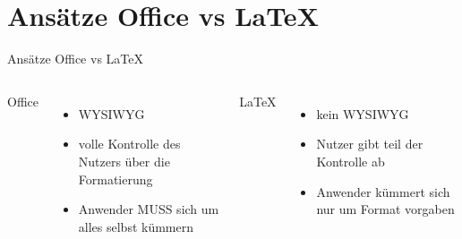 \section{Ansätze Office  vs  \LaTeX}

\begin{frame}{Ansätze Office  vs  \LaTeX}
	\begin{columns}
	
		Office
		\begin{itemize}
			\item WYSIWYG
			\item volle Kontrolle des Nutzers über die Formatierung
			\item Anwender MUSS sich um alles selbst kümmern
		
		\end{itemize}
		\LaTeX{}
		\begin{itemize}
				\item kein WYSIWYG
				\item Nutzer gibt teil der Kontrolle ab
				\item Anwender kümmert sich nur um Format vorgaben
		\end{itemize}
	\end{columns}
\end{frame}